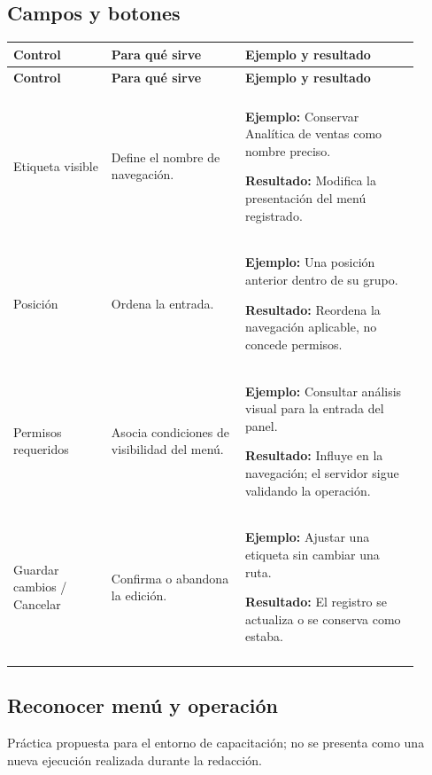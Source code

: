 \subsection{Campos y botones}
\begingroup
\fontsize{10}{12.5}\selectfont
\setlength{\tabcolsep}{5pt}
\renewcommand{\arraystretch}{1.15}
\begin{longtable}{@{}>{\RaggedRight\arraybackslash}p{0.22\linewidth}>{\RaggedRight\arraybackslash}p{0.3\linewidth}>{\RaggedRight\arraybackslash}p{0.39\linewidth}@{}}
\toprule
\textbf{Control} & \textbf{Para qué sirve} & \textbf{Ejemplo y resultado} \\
\midrule
\endfirsthead
\toprule
\textbf{Control} & \textbf{Para qué sirve} & \textbf{Ejemplo y resultado} \\
\midrule
\endhead
\midrule
\multicolumn{3}{r}{\footnotesize Continúa en la página siguiente}\\
\endfoot
\bottomrule
\endlastfoot
Etiqueta visible & Define el nombre de navegación. & \textbf{Ejemplo:} Conservar Analítica de ventas como nombre preciso.\par\smallskip\textbf{Resultado:} Modifica la presentación del menú registrado. \\
\addlinespace[3pt]
Posición & Ordena la entrada. & \textbf{Ejemplo:} Una posición anterior dentro de su grupo.\par\smallskip\textbf{Resultado:} Reordena la navegación aplicable, no concede permisos. \\
\addlinespace[3pt]
Permisos requeridos & Asocia condiciones de visibilidad del menú. & \textbf{Ejemplo:} Consultar análisis visual para la entrada del panel.\par\smallskip\textbf{Resultado:} Influye en la navegación; el servidor sigue validando la operación. \\
\addlinespace[3pt]
Guardar cambios / Cancelar & Confirma o abandona la edición. & \textbf{Ejemplo:} Ajustar una etiqueta sin cambiar una ruta.\par\smallskip\textbf{Resultado:} El registro se actualiza o se conserva como estaba. \\
\addlinespace[3pt]
\end{longtable}
\endgroup

\subsection{Reconocer menú y operación}
Práctica propuesta para el entorno de capacitación; no se presenta como una nueva ejecución realizada durante la redacción.

